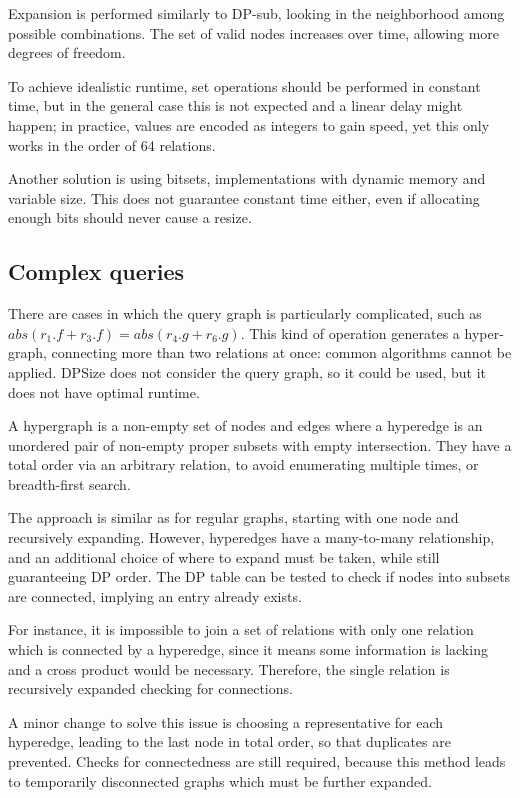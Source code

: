 Expansion is performed similarly to DP-sub, looking in the neighborhood among possible combinations. The set of valid nodes increases over time, allowing more degrees of freedom.

To achieve idealistic runtime, set operations should be performed in constant time, but in the general case this is not expected and a linear delay might happen; in practice, values are encoded as integers to gain speed, yet this only works in the order of 64 relations.

Another solution is using bitsets, implementations with dynamic memory and variable size. This does not guarantee constant time either, even if allocating enough bits should never cause a resize.

\subsection{Complex queries}
There are cases in which the query graph is particularly complicated, such as $abs(r_1.f + r_3.f) = abs(r_4.g + r_6.g)$. This kind of operation generates a hyper-graph, connecting more than two relations at once: common algorithms cannot be applied. DPSize does not consider the query graph, so it could be used, but it does not have optimal runtime.

A hypergraph is a non-empty set of nodes and edges where a hyperedge is an unordered pair of non-empty proper subsets with empty intersection. They have a total order via an arbitrary relation, to avoid enumerating multiple times, or breadth-first search.

The approach is similar as for regular graphs, starting with one node and recursively expanding. However, hyperedges have a many-to-many relationship, and an additional choice of where to expand must be taken, while still guaranteeing DP order. The DP table can be tested to check if nodes into subsets are connected, implying an entry already exists. 

For instance, it is impossible to join a set of relations with only one relation which is connected by a hyperedge, since it means some information is lacking and a cross product would be necessary. Therefore, the single relation is recursively expanded checking for connections.

A minor change to solve this issue is choosing a representative for each hyperedge, leading to the last node in total order, so that duplicates are prevented. Checks for connectedness are still required, because this method leads to temporarily disconnected graphs which must be further expanded.

